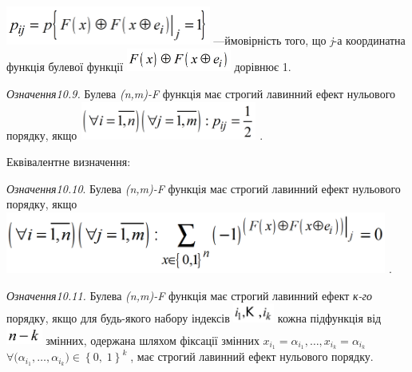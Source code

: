  \includegraphics[width=2.6528in,height=0.498in]{crypt-img/crypt-img229.png}
\textit{ }---ймовірність того, що \textit{j}{}-а координатна функція булевої
функції 
\includegraphics[width=1.3555in,height=0.3028in]{crypt-img/crypt-img230.png} 
дорівнює  1.

\textit{ Означення10.9.} Булева 
\textit{(}\textit{n}\textit{,}\textit{m}\textit{)-}\textit{F}  функція має
строгий лавинний ефект нульового порядку, якщо 
\includegraphics[width=2.2874in,height=0.4882in]{crypt-img/crypt-img231.png} .

Еквівалентне визначення:

 \textit{Означення10.10}. Булева
\textit{(}\textit{n}\textit{,}\textit{m}\textit{)-}\textit{F} функція має
строгий лавинний ефект нульового порядку, якщо 
\includegraphics[width=4.9409in,height=0.7929in]{crypt-img/crypt-img232.png} .

\textit{ Означення10.11.} Булева
\textit{(}\textit{n}\textit{,}\textit{m}\textit{)-}\textit{F}  функція має
строгий лавинний ефект \textit{к-го }порядку, якщо для будь-якого набору
індексів 
\includegraphics[width=0.528in,height=0.25in]{crypt-img/crypt-img233.png} 
кожна підфункція від 
\includegraphics[width=0.4638in,height=0.2374in]{crypt-img/crypt-img234.png} 
змінних, одержана шляхом фіксації змінних  ${x_{i_{{1}}}=\alpha
_{i_{1}}{,\dots,x_{i_{k}}}{=\alpha _{i_{k}}}}$ 
${\forall (\alpha _{i_{{1}}},\dots,\alpha _{i_{k}}{)\in
\left\{ 0,\;1 \right\}^{k}}{\;}}$, має строгий лавинний ефект нульового порядку. 

